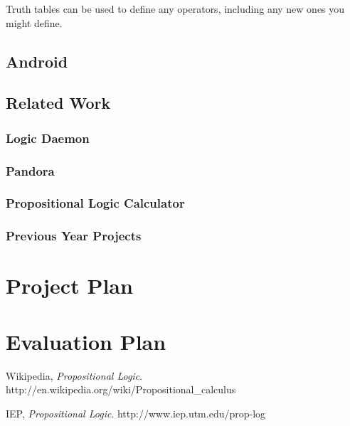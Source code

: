 \documentclass{report}
\begin{document}
Truth tables can be used to define any operators, including any new ones you might define.

\section{Android}


\section{Related Work}


\subsection{Logic Daemon}


\subsection{Pandora}


\subsection{Propositional Logic Calculator}


\subsection{Previous Year Projects}


\chapter{Project Plan}


\chapter{Evaluation Plan}


\begin{thebibliography}{9}

  Wikipedia,
  \emph{Propositional Logic}.
  http://en.wikipedia.org/wiki/Propositional\_calculus

  IEP,
  \emph{Propositional Logic}.
  http://www.iep.utm.edu/prop-log

\end{thebibliography}
\end{document}
